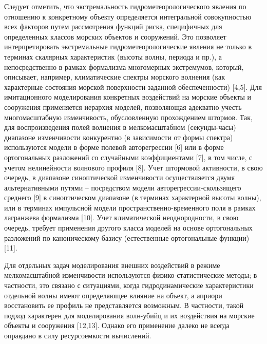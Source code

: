 Следует отметить, что экстремальность гидрометеорологического явления по отношению к конкретному объекту определяется интегральной совокупностью всех факторов путем рассмотрения функций риска, специфичных для определенных классов морских объектов и сооружений. Это позволяет интерпретировать экстремальные гидрометеорологические явления не только в терминах скалярных характеристик (высоты волны, периода и пр.), а непосредственно в рамках формализма многомерных экстремумов, который, описывает, например, климатические спектры морского волнения (как характерные состояния морской поверхности заданной обеспеченности) [4,5].
Для имитационного моделирования конкретных воздействий на морские объекты и сооружения применяется иерархия моделей, позволяющая адекватно учесть многомасштабную изменчивость, обусловленную прохождением штормов. Так, для воспроизведения полей волнения в мелкомасштабном (секунды-часы) диапазоне изменчивости конкурентно (в зависимости от формы спектра) используются модели в форме полевой авторегрессии [6] или в форме ортогональных разложений со случайными коэффициентами [7], в том числе, с учетом нелинейности волнового профиля [8]. Учет штормовой активности, в свою очередь, в диапазоне синоптической изменчивости осуществляется двумя альтернативными путями – посредством модели авторегрессии-скользящего среднего [9] в синоптическом диапазоне (в терминах характерной высоты волны), или в терминах импульсной модели пространственно-временного поля в рамках лагранжева формализма [10]. Учет климатической неоднородности, в свою очередь, требует применения другого класса моделей на основе ортогональных разложений по каноническому базису (естественные ортогональные функции) [11].

Для отдельных задач моделирования внешних воздействий в режиме мелкомасштабной изменчивости используются физико-статистические методы; в частности, это связано с ситуациями, когда гидродинамические характеристики отдельной волны имеют определяющее влияние на объект, а априори восстановить ее профиль не представляется возможным. В частности, такой подход характерен для моделирования волн-убийц и их воздействия на морские объекты и сооружения [12,13]. Однако его применение далеко не всегда оправдано в силу ресурсоемкости вычислений.

